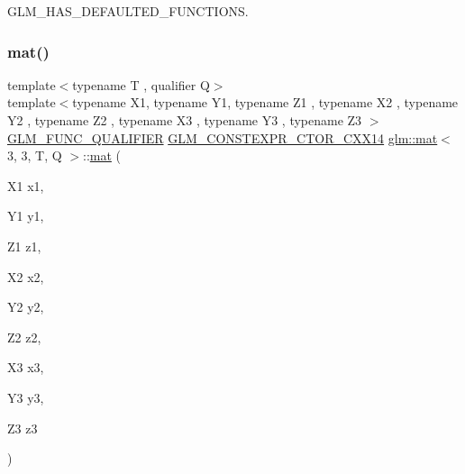 G\+L\+M\+\_\+\+H\+A\+S\+\_\+\+D\+E\+F\+A\+U\+L\+T\+E\+D\+\_\+\+F\+U\+N\+C\+T\+I\+O\+NS. 

\mbox{\label{structglm_1_1mat_3_013_00_013_00_01_t_00_01_q_01_4_a16e5dfdbeabd922f89d0b7ac9a6a07cc}} 
\subsubsection{\texorpdfstring{mat()}{mat()}\hspace{0.1cm}{\footnotesize\ttfamily [19/21]}}
{\footnotesize\ttfamily template$<$typename T , qualifier Q$>$ \\
template$<$typename X1, typename Y1, typename Z1 , typename X2 , typename Y2 , typename Z2 , typename X3 , typename Y3 , typename Z3 $>$ \\
\mbox{\hyperlink{setup_8hpp_a33fdea6f91c5f834105f7415e2a64407}{G\+L\+M\+\_\+\+F\+U\+N\+C\+\_\+\+Q\+U\+A\+L\+I\+F\+I\+ER}} \mbox{\hyperlink{setup_8hpp_a0900f9145e68bf6061b6f5e7be3fa751}{G\+L\+M\+\_\+\+C\+O\+N\+S\+T\+E\+X\+P\+R\+\_\+\+C\+T\+O\+R\+\_\+\+C\+X\+X14}} \mbox{\hyperlink{structglm_1_1mat}{glm\+::mat}}$<$ 3, 3, T, Q $>$\+::\mbox{\hyperlink{structglm_1_1mat}{mat}} (\begin{DoxyParamCaption}\item[{X1}]{x1,  }\item[{Y1}]{y1,  }\item[{Z1}]{z1,  }\item[{X2}]{x2,  }\item[{Y2}]{y2,  }\item[{Z2}]{z2,  }\item[{X3}]{x3,  }\item[{Y3}]{y3,  }\item[{Z3}]{z3 }\end{DoxyParamCaption})}

\mbox{\label{structglm_1_1mat_3_013_00_013_00_01_t_00_01_q_01_4_a4795e853feaed2593cdee9e041da1f58}} 

